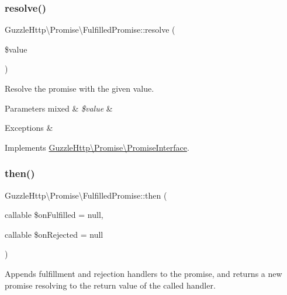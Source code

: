 \subsubsection{\texorpdfstring{resolve()}{resolve()}}
{\footnotesize\ttfamily Guzzle\+Http\textbackslash{}\+Promise\textbackslash{}\+Fulfilled\+Promise\+::resolve (\begin{DoxyParamCaption}\item[{}]{\$value }\end{DoxyParamCaption})}

Resolve the promise with the given value.


\begin{DoxyParams}[1]{Parameters}
mixed & {\em \$value} & \\
\hline
\end{DoxyParams}

\begin{DoxyExceptions}{Exceptions}
{\em } & \\
\hline
\end{DoxyExceptions}


Implements \hyperlink{interfaceGuzzleHttp_1_1Promise_1_1PromiseInterface_ae39a5f1a81903f74af5114c272bf7b7b}{Guzzle\+Http\textbackslash{}\+Promise\textbackslash{}\+Promise\+Interface}.

\mbox{\label{classGuzzleHttp_1_1Promise_1_1FulfilledPromise_aecac67e3bd3294aae15a10748b81c155}} 
\subsubsection{\texorpdfstring{then()}{then()}}
{\footnotesize\ttfamily Guzzle\+Http\textbackslash{}\+Promise\textbackslash{}\+Fulfilled\+Promise\+::then (\begin{DoxyParamCaption}\item[{callable}]{\$on\+Fulfilled = {\ttfamily null},  }\item[{callable}]{\$on\+Rejected = {\ttfamily null} }\end{DoxyParamCaption})}

Appends fulfillment and rejection handlers to the promise, and returns a new promise resolving to the return value of the called handler.



